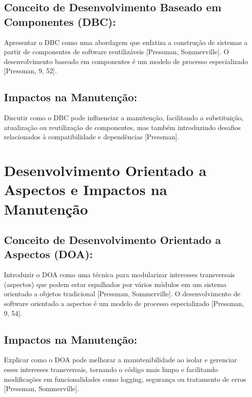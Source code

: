 \documentclass[
]{book}
\begin{document}
\subsection{Conceito de Desenvolvimento Baseado em Componentes (DBC):}\label{conceito-de-desenvolvimento-baseado-em-componentes-dbc}

Apresentar o DBC como uma abordagem que enfatiza a construção de sistemas a partir de componentes de software reutilizáveis {[}Pressman, Sommerville{]}. O desenvolvimento baseado em componentes é um modelo de processo especializado {[}Pressman, 9, 52{]}.

\subsection{Impactos na Manutenção:}\label{impactos-na-manutenuxe7uxe3o}

Discutir como o DBC pode influenciar a manutenção, facilitando a substituição, atualização ou reutilização de componentes, mas também introduzindo desafios relacionados à compatibilidade e dependências {[}Pressman{]}.

\section{Desenvolvimento Orientado a Aspectos e Impactos na Manutenção}\label{desenvolvimento-orientado-a-aspectos-e-impactos-na-manutenuxe7uxe3o}

\subsection{Conceito de Desenvolvimento Orientado a Aspectos (DOA):}\label{conceito-de-desenvolvimento-orientado-a-aspectos-doa}

Introduzir o DOA como uma técnica para modularizar interesses transversais (aspectos) que podem estar espalhados por vários módulos em um sistema orientado a objetos tradicional {[}Pressman, Sommerville{]}. O desenvolvimento de software orientado a aspectos é um modelo de processo especializado {[}Pressman, 9, 54{]}.

\subsection{Impactos na Manutenção:}\label{impactos-na-manutenuxe7uxe3o-1}

Explicar como o DOA pode melhorar a manutenibilidade ao isolar e gerenciar esses interesses transversais, tornando o código mais limpo e facilitando modificações em funcionalidades como logging, segurança ou tratamento de erros {[}Pressman, Sommerville{]}.
\end{document}
